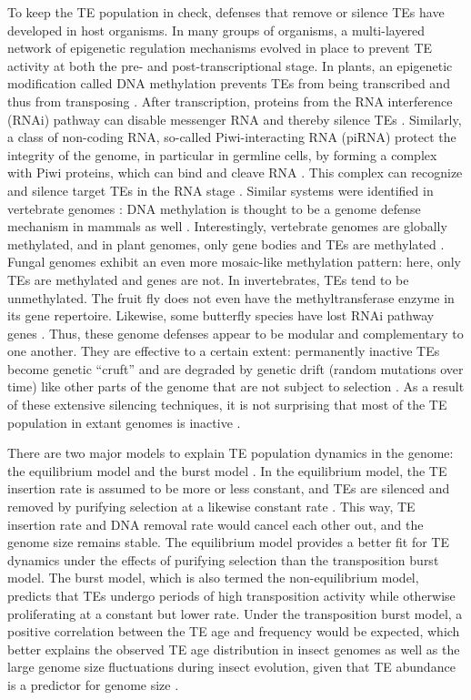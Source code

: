To keep the TE population in check, defenses that remove or silence TEs
have developed in host organisms. In many groups of organisms, a
multi-layered network of epigenetic regulation mechanisms evolved in
place to prevent TE activity at both the pre- and post-transcriptional
stage. In plants, an epigenetic modification called DNA methylation
prevents TEs from being transcribed and thus from transposing
\citep{Slotkin2007, Lisch2009}. After transcription, proteins from the
RNA interference (RNAi) pathway can disable messenger RNA and thereby
silence TEs \citep{Buchon2006}. Similarly, a class of non-coding RNA,
so-called Piwi-interacting RNA (piRNA) protect the integrity of the
genome, in particular in germline cells, by forming a complex with Piwi
proteins, which can bind and cleave RNA \citep{Zeng2011}. This complex
can recognize and silence target TEs in the RNA stage \citep{Siomi2011,
Mondal2018}.  Similar systems were identified in vertebrate genomes
\citep{Suzuki2008, Schubeler2015}: DNA methylation is thought to be a
genome defense mechanism in mammals as well \citep{Yoder1997}.
Interestingly, vertebrate genomes are globally methylated, and in plant
genomes, only gene bodies and TEs are methylated \citep{Suzuki2008}.
Fungal genomes exhibit an even more mosaic-like methylation pattern:
here, only TEs are methylated and genes are not. In invertebrates, TEs
tend to be unmethylated. The fruit fly 
does not even have the methyltransferase enzyme in its gene repertoire. Likewise, some
butterfly species have lost RNAi pathway genes \citep{Pauli2016}. Thus,
these genome defenses appear to be modular and complementary to one
another. They are effective to a certain extent: permanently inactive
TEs become genetic ``cruft'' and are degraded by genetic drift (random
mutations over time) like other parts of the genome that are not subject
to selection \citep{Szitenberg2016}. As a result of these extensive
silencing techniques, it is not surprising that most of the TE
population in extant genomes is inactive \citep{Yoder1997,
Zilberman2007}.

There are two major models to explain TE population dynamics in the
genome: the equilibrium model and the burst model \citep{Petrov2011,
Kofler2012, Cridland2013, Blumenstiel2014}. In the equilibrium model,
the TE insertion rate is assumed to be more or less constant, and TEs
are silenced and removed by purifying selection at a likewise constant
rate \citep{Charlesworth1983}. This way, TE insertion rate and DNA
removal rate would cancel each other out, and the genome size remains
stable.  The equilibrium model provides a better fit for TE dynamics
under the effects of purifying selection \citep{Barron2014} than the
transposition burst model. The burst model, which is also termed the
non-equilibrium model, predicts that TEs undergo periods of high
transposition activity while otherwise proliferating at a constant but
lower rate. Under the transposition burst model, a positive correlation
between the TE age and frequency would be expected, which better
explains the observed TE age distribution in insect genomes as well as
the large genome size fluctuations during insect evolution, given that
TE abundance is a predictor for genome size \citep{Alfsnes2017,
Petersen2018a}.

